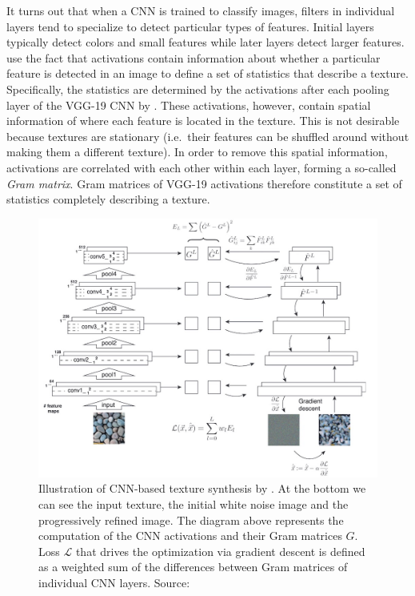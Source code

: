 It turns out that when a CNN is trained to classify images, filters in individual layers tend to specialize to detect particular types of features. Initial layers typically detect colors and small features while later layers detect larger features. \citet{Gatys2015} use the fact that activations contain information about whether a particular feature is detected in an image to define a set of statistics that describe a texture. Specifically, the statistics are determined by the activations after each pooling layer of the VGG-19 CNN by \citet{Simonyan2014}. These activations, however, contain spatial information of where each feature is located in the texture. This is not desirable because textures are stationary (i.e.~their features can be shuffled around without making them a different texture). In order to remove this spatial information, activations are correlated with each other within each layer, forming a so-called \textit{Gram matrix}. Gram matrices of VGG-19 activations therefore constitute a set of statistics completely describing a texture.

\begin{figure}[ht]
    \centering
    \includegraphics[width=\textwidth]{images/02-gatys_method.jpg}
    \caption{Illustration of CNN-based texture synthesis by \citet{Gatys2015}. At the bottom we can see the input texture, the initial white noise image and the progressively refined image. The diagram above represents the computation of the CNN activations and their Gram matrices \(G\). Loss \(\mathcal{L}\) that drives the optimization via gradient descent is defined as a weighted sum of the differences between Gram matrices of individual CNN layers. Source: \citet{Gatys2015}}
    \label{fig:background_gatys_method}
\end{figure}

